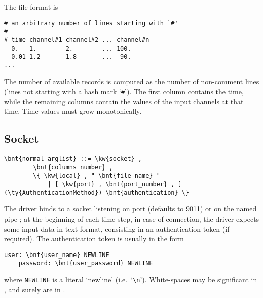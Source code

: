 The file format is
\begin{verbatim}
# an arbitrary number of lines starting with `#'
#
# time channel#1 channel#2 ... channel#n
  0.   1.        2.        ... 100.
  0.01 1.2       1.8       ...  90.
...
\end{verbatim}
The number of available records is computed as the number
of non-comment lines (lines not starting with a hash mark `\texttt{\#}').
The first column contains the time, while the remaining
 columns contain the values of the input channels
at that time.
Time values must grow monotonically.


\subsection{Socket}
\begin{Verbatim}[commandchars=\\\{\}]
    \bnt{normal_arglist} ::= \kw{socket} , 
        \bnt{columns_number} ,
        \{ \kw{local} , " \bnt{file_name} " 
            | [ \kw{port} , \bnt{port_number} , ] (\ty{AuthenticationMethod}) \bnt{authentication} \}
\end{Verbatim}
The driver binds to a socket listening on port  
(defaults to 9011) or on the named pipe ; at the
beginning of each time step, in case of connection, the driver expects some
input data in text format, consisting in an authentication token 
(if required).
The authentication token is usually in the form
\begin{Verbatim}[commandchars=\\\{\}]
    user: \bnt{user_name} NEWLINE
    password: \bnt{user_password} NEWLINE
\end{Verbatim}
where \texttt{NEWLINE} is a literal `newline' (i.e.\ `\verb;\n;').
White-spaces may be significant in , 
and surely are in .

